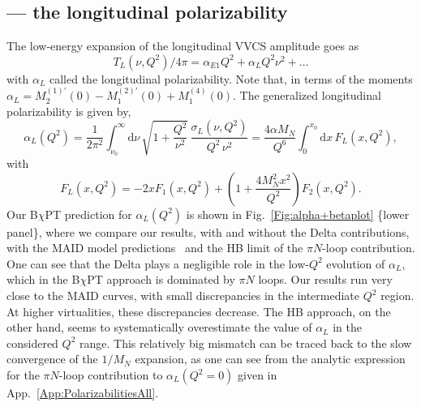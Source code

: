 \documentclass[12pt,preprint,tightenlines,
showpacs,preprintnumbers,amsmath,amssymb,
a4paper,nofootinbib]{revtex4-2}
\def\beq{\begin{equation}}
\def\eeq{\end{equation}}
\def\al{\alpha}
\def\nn{\nonumber}
\def\dd{\mathrm{d}}
\begin{document}
\subsection{ --- the longitudinal polarizability}

The low-energy expansion of the longitudinal VVCS amplitude goes as
\beq 
T_L(\nu, Q^2)/4\pi = \al_{E1} Q^2 + \al_L Q^2\nu^2 +\ldots
\eeq 
with $\al_L$ called the longitudinal polarizability. Note that, in terms
of the moments  $\alpha_L = M^{(1)\prime}_2(0)  - M^{(2)\prime}_1(0) 
+ M^{(4)}_1(0)$. The generalized longitudinal polarizability is given by,
\beq
\alpha_L (Q^2)= \frac{1}{2 \pi^2} \int_{\nu_0}^\infty\! \dd\nu\,\sqrt{1+\frac{Q^2}{\nu^{2}}}\,            \frac{\sigma_L (\nu,Q^2)}{Q^2\, \nu^{2}} = \frac{4 \al M_N}{Q^6}\int_0^{x_0}\! \dd x \, F_L(x,Q^2),\label{Eq:alphaLQ2}
\eeq
with
\beq
F_L(x,Q^2)=-2xF_1(x,Q^2)+\left(1+\frac{4M_N^2 x^2}{Q^2}\right)F_2(x,Q^2).\nn
\eeq
Our B$\chi$PT prediction for $\alpha_L(Q^2)$ is shown in Fig.~\ref{Fig:alpha+betaplot} \{lower panel\}, 
where we compare our results, with and without the Delta contributions, with the MAID model predictions~\cite{Drechsel:2000ct,Drechsel:1998hk,Drechsel:2002ar,private-Lothar} and the HB limit of the $\pi N$-loop contribution. One can see that the Delta plays a negligible role in the low-$Q^2$ evolution of $\alpha_L$, which in the B$\chi$PT approach is dominated by $\pi N$ loops.
Our results run very close to the MAID curves, with small discrepancies in the intermediate $Q^2$ region.
At higher virtualities, these discrepancies decrease.
The HB approach, on the other hand, seems to systematically overestimate the value of $\alpha_L$ in the considered $Q^2$ range. 
This relatively big mismatch can be traced back to the slow convergence of the $1/M_N$ expansion, as one can see from the analytic expression for the $\pi N$-loop contribution to $\alpha_L(Q^2=0)$ given in  App.~\ref{App:PolarizabilitiesAll}. 
\end{document}
